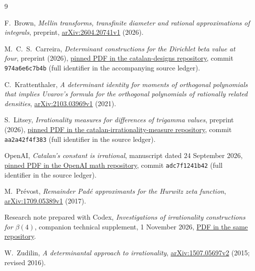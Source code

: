 \documentclass[11pt]{article}
\theoremstyle{definition}
\theoremstyle{remark}
\numberwithin{equation}{section}
\begin{document}
\clearpage
\begin{thebibliography}{9}

F.~Brown,
\emph{Mellin transforms, transfinite diameter and rational approximations
of integrals}, preprint,
\href{https://arxiv.org/abs/2604.20741v1}{arXiv:2604.20741v1} (2026).

M.~C.~S.~Carreira,
\emph{Determinant constructions for the Dirichlet beta value at four},
preprint (2026),
\href{https://github.com/MarcosCarreira/catalan-designs/blob/974a6e6c7b4bce67538aa1b9bf5883b931789d1f/paper/beta4_determinants.pdf}{pinned PDF in the catalan-designs repository},
commit \texttt{974a6e6c7b4b} (full identifier in the accompanying source ledger).

C.~Krattenthaler,
\emph{A determinant identity for moments of orthogonal polynomials that
implies Uvarov's formula for the orthogonal polynomials of rationally
related densities},
\href{https://arxiv.org/abs/2103.03969v1}{arXiv:2103.03969v1} (2021).

S.~Litsey,
\emph{Irrationality measures for differences of trigamma values},
preprint (2026),
\href{https://github.com/slitsey/catalan-irrationality-measure/blob/aa2a42f4f3835347ad46608779e22dd52c2dc7bf/paper-lambda/lambda-irrationality.pdf}{pinned PDF in the catalan-irrationality-measure repository},
commit \texttt{aa2a42f4f383} (full identifier in the source ledger).

OpenAI,
\emph{Catalan's constant is irrational}, manuscript dated
24 September 2026,
\href{https://github.com/openai/math/blob/adc7f1241b42e322a6451854ab7e4b4c146bf78a/preprints/Catalans-constant-is-irrational-September-24-2026/paper.pdf}{pinned PDF in the OpenAI math repository},
commit \texttt{adc7f1241b42} (full identifier in the source ledger).

M.~Pr\'evost,
\emph{Remainder Pad\'e approximants for the Hurwitz zeta function},
\href{https://arxiv.org/abs/1709.05389v1}{arXiv:1709.05389v1} (2017).

Research note prepared with Codex,
\emph{Investigations of irrationality constructions for $\beta(4)$},
companion technical supplement, 1 November 2026,
\href{run:beta4-investigations.pdf}{PDF in the same repository}.

W.~Zudilin,
\emph{A determinantal approach to irrationality},
\href{https://arxiv.org/abs/1507.05697v2}{arXiv:1507.05697v2}
(2015; revised 2016).

\end{thebibliography}
\end{document}
